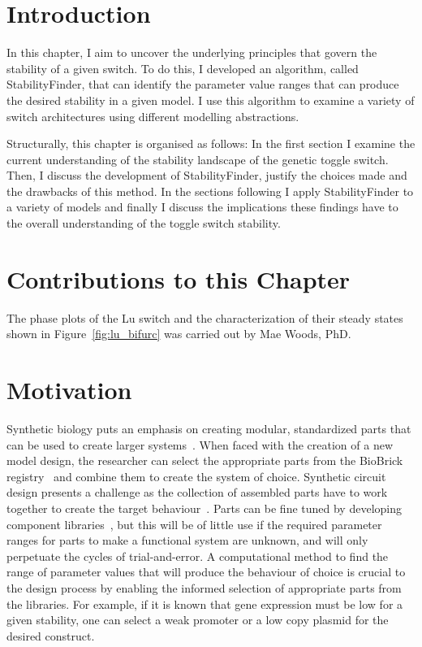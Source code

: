 \section{Introduction}

In this chapter, I aim to uncover the underlying principles that govern the stability of a given switch. To do this, I developed an algorithm, called StabilityFinder, that can identify the parameter value ranges that can produce the desired stability in a given model. I use this algorithm to examine a variety of switch architectures using different modelling abstractions.

Structurally, this chapter is organised as follows: In the first section I examine the current understanding of the stability landscape of the genetic toggle switch. Then, I discuss the development of StabilityFinder, justify the choices made and the drawbacks of this method. In the sections following I apply StabilityFinder to a variety of models and finally I discuss the implications these findings have to the overall understanding of the toggle switch stability. 

\section{Contributions to this Chapter}
The phase plots of the Lu switch and the characterization of their steady states shown in Figure~\ref{fig:lu_bifurc} was carried out by Mae Woods, PhD.

\section{Motivation}

Synthetic biology puts an emphasis on creating modular, standardized parts that can be used to create larger systems~\autocite{Agapakis:2009bt}. When faced with the creation of a new model design, the researcher can select the appropriate parts from the BioBrick registry~\autocite{Muller:2011bp} and combine them to create the system of choice. Synthetic circuit design presents a challenge as the collection of assembled parts have to work together to create the target behaviour~\autocite{Nielsen:2013hs}. Parts can be fine tuned by developing component libraries~\autocite{Lu:2009ez}, but this will be of little use if the required parameter ranges for parts to make a functional system are unknown, and will only perpetuate the cycles of trial-and-error. A computational method to find the range of parameter values that will produce the behaviour of choice is crucial to the design process by enabling the informed selection of appropriate parts from the libraries. For example, if it is known that gene expression must be low for a given stability, one can select a weak promoter or a low copy plasmid for the desired construct. 

